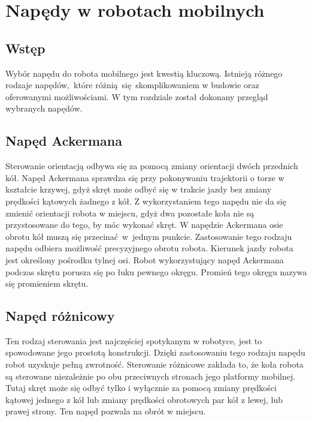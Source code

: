 \newpage
\section{Napędy w robotach mobilnych}
{
    \subsection{Wstęp}
    {
    Wybór napędu do robota mobilnego jest kwestią kluczową. Istnieją różnego rodzaje napędów,~które różnią~się~skomplikowaniem w budowie oraz oferowanymi możliwościami. W tym rozdziale został dokonany przegląd wybranych napędów.
    }
    
    \subsection{Napęd Ackermana}
    {
        Sterowanie orientacją \cite{ackerman} odbywa się za pomocą zmiany orientacji dwóch przednich kół. Napęd Ackermana sprawdza się przy pokonywaniu trajektorii o torze w kształcie krzywej, gdyż skręt może odbyć się w trakcie jazdy bez zmiany prędkości kątowych żadnego z kół. Z wykorzystaniem tego napędu nie da się zmienić orientacji robota w miejscu, gdyż dwa pozostałe koła nie są przystosowane do tego, by móc wykonać skręt. W napędzie Ackermana osie obrotu kół muszą się przecinać~w~jednym punkcie. Zastosowanie tego rodzaju napędu odbiera możliwość precyzyjnego obrotu robota. Kierunek jazdy robota jest określony pośrodku tylnej osi. Robot wykorzystujący napęd Ackermana podczas skrętu porusza się po łuku pewnego okręgu. Promień tego okręgu nazywa się promieniem skrętu.
        
        
    }
    \subsection{Napęd różnicowy}
    {
        Ten rodzaj sterowania \cite{diff_steering} jest najczęściej spotykanym w robotyce, jest to spowodowane jego prostotą konstrukcji. Dzięki zastosowaniu tego rodzaju napędu robot uzyskuje pełną zwrotność. Sterowanie różnicowe zakłada to, że koła robota są sterowane niezależnie po obu przeciwnych stronach jego platformy mobilnej.
        Tutaj skręt może się odbyć tylko i wyłącznie za pomocą zmiany prędkości kątowej jednego z kół lub zmiany prędkości obrotowych par kół z lewej, lub prawej strony.
        Ten napęd pozwala na obrót w miejscu.
        
}}
